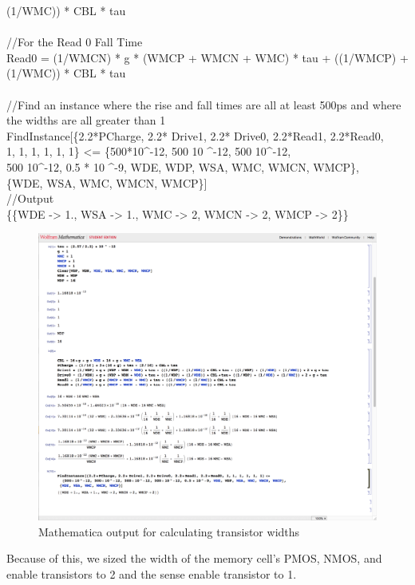\documentclass[a4paper]{article}
\newcommand\tab[1][1cm]{\hspace*{#1}}
\begin{document}
{\tab (1/WMC)) * CBL * tau\\
\\
\textnormal{//For the Read 0 Fall Time}\\
Read0 = (1/WMCN) * g * (WMCP + WMCN  + WMC) * tau + ((1/WMCP) +\\
\tab (1/WMC)) * CBL * tau\\
\\
\textnormal{//Find an instance where the rise and fall times are all at least 500ps and where the widths are all greater than 1}\\
FindInstance[\{2.2*PCharge, 2.2* Drive1, 2.2* Drive0, 2.2*Read1, 2.2*Read0,\\
\tab 1, 1, 1, 1, 1, 1\} <= \{500*10\textasciicircum -12, 500 10 \textasciicircum -12, 500 10\textasciicircum -12,\\
\tab 500 10\textasciicircum -12, 0.5 * 10 \textasciicircum -9, WDE, WDP, WSA, WMC, WMCN, WMCP\},\\
\tab \{WDE, WSA, WMC, WMCN, WMCP\}]\\
\textnormal{//Output}\\
\{\{WDE -> 1., WSA -> 1., WMC -> 2, WMCN -> 2, WMCP -> 2\}\}
}

\begin{figure}[H]
	\centering
	\includegraphics[scale=0.3]{sizingMath}
	\caption{Mathematica output for calculating transistor widths}
	\label{fig:sizingMath}
\end{figure}

Because of this, we sized the width of the memory cell's PMOS, NMOS, and enable transistors to 2 and the sense enable transistor to 1. 
\end{document}
